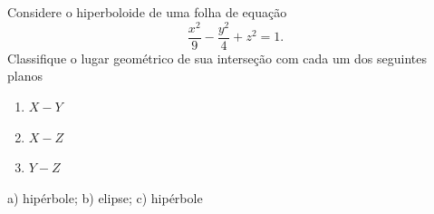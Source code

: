 \begin{exer}
  Considere o hiperboloide de uma folha de equação
  \begin{equation}
    \frac{x^2}{9}-\frac{y^2}{4}+z^2=1.
  \end{equation}
  Classifique o lugar geométrico de sua interseção com cada um dos seguintes planos
  \begin{enumerate}
  \item $X-Y$
  \item $X-Z$
  \item $Y-Z$
  \end{enumerate}
\end{exer}
\begin{resp}
  a) hipérbole; b) elipse; c) hipérbole
\end{resp}
